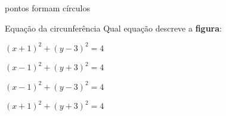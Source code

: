 \documentclass{article}
\begin{document}
\begin{quiz}{pontos formam círculos}
    \begin{multi}[shuffle=true]{Equação da circunferência}
      Qual equação descreve a \textbf{figura}: 
     
      \item* $(x + 1)^2 + (y-3)^2 = 4$
      \item $(x-1)^2 + (y + 3)^2 = 4$
      \item $(x-1)^2 + (y-3)^2 = 4$
      \item $(x + 1)^2 + (y + 3)^2 = 4$
    \end{multi}
  \end{quiz} 
\end{document}
